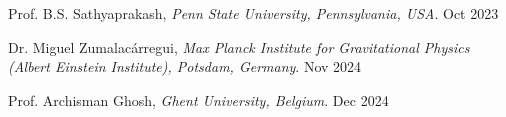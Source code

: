 \begin{itemize}[noitemsep]
    {
    \item Prof. B.S. Sathyaprakash, \textit{Penn State University, Pennsylvania, USA}. \hfill{Oct 2023}
    \item Dr. Miguel Zumalac\'arregui, \textit{Max Planck Institute for Gravitational Physics (Albert Einstein Institute), Potsdam, Germany}. \hfill{Nov 2024}
    \item Prof. Archisman Ghosh, \textit{Ghent University, Belgium}. \hfill{Dec 2024}
    }\end{itemize}
    